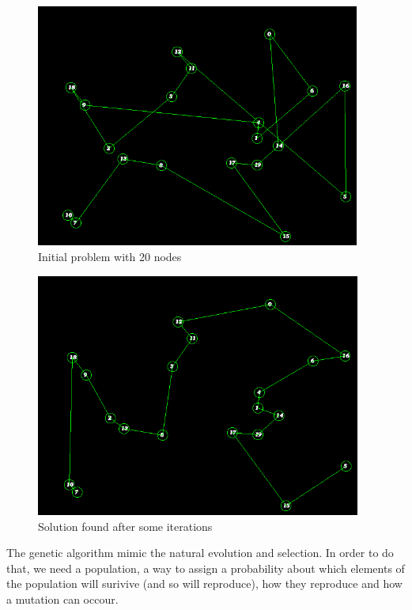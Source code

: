 \documentclass{article}
\begin{document}
    \begin{figure}
        \includegraphics[width=\linewidth, height=8cm]{img/init.png}
        \caption{Initial problem with 20 nodes}
        \label{fig:init}
    \end{figure}
    \begin{figure}
        \includegraphics[width=\linewidth, height=8cm]{img/sol.png}
        \caption{Solution found after some iterations}
        \label{fig:sol}
    \end{figure}
        The genetic algorithm mimic the natural evolution and selection. In order to do that, we need a population, a way to assign a probability about which elements of the population will surivive (and so will reproduce), how they reproduce and how a mutation can occour.
\end{document}
